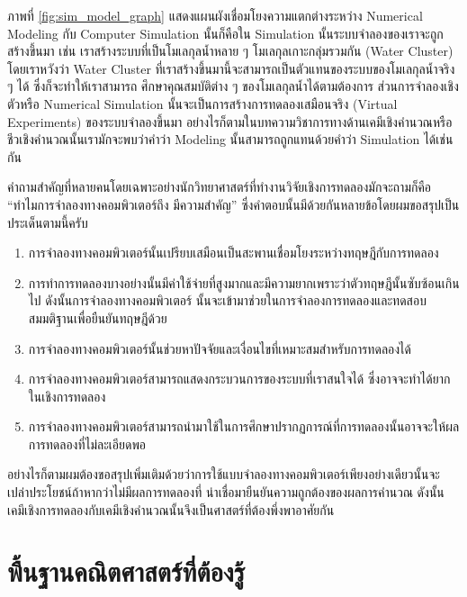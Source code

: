 ภาพที่ \ref{fig:sim_model_graph} แสดงแผนผังเชื่อมโยงความแตกต่างระหว่าง Numerical Modeling กับ Computer Simulation
นั้นก็คือใน Simulation นั้นระบบจำลองของเราจะถูกสร้างขึ้นมา เช่น เราสร้างระบบที่เป็นโมเลกุลน้ำหลาย ๆ โมเลกุลเกาะกลุ่มรวมกัน (Water
Cluster) โดยเราหวังว่า Water Cluster ที่เราสร้างขึ้นมานี้จะสามารถเป็นตัวแทนของระบบของโมเลกุลน้ำจริง ๆ ได้ ซึ่งก็จะทำให้เราสามารถ%
ศึกษาคุณสมบัติต่าง ๆ ของโมเลกุลน้ำได้ตามต้องการ ส่วนการจำลองเชิงตัวหรือ Numerical Simulation นั้นจะเป็นการสร้างการทดลองเสมือนจริง
(Virtual Experiments) ของระบบจำลองขึ้นมา อย่างไรก็ตามในบทความวิชาการทางด้านเคมีเชิงคำนวณหรือชีวเชิงคำนวณนั้นเรามักจะพบว่าคำว่า
Modeling นั้นสามารถถูกแทนด้วยคำว่า Simulation ได้เช่นกัน

คำถามสำคัญที่หลายคนโดยเฉพาะอย่างนักวิทยาศาสตร์ที่ทำงานวิจัยเชิงการทดลองมักจะถามก็คือ \enquote{ทำไมการจำลองทางคอมพิวเตอร์ถึง%
    มีความสำคัญ} ซึ่งคำตอบนั้นมีด้วยกันหลายข้อโดยผมขอสรุปเป็นประเด็นตามนี้ครับ

\begin{enumerate}[topsep=0pt,noitemsep]
    \setlength\itemsep{1em}
    \item การจำลองทางคอมพิวเตอร์นั้นเปรียบเสมือนเป็นสะพานเชื่อมโยงระหว่างทฤษฎีกับการทดลอง

    \item การทำการทดลองบางอย่างนั้นมีค่าใช้จ่ายที่สูงมากและมีความยากเพราะว่าตัวทฤษฎีนั้นซับซ้อนเกินไป ดังนั้นการจำลองทางคอมพิวเตอร์%
          นั้นจะเข้ามาช่วยในการจำลองการทดลองและทดสอบสมมติฐานเพื่อยืนยันทฤษฎีด้วย

    \item การจำลองทางคอมพิวเตอร์นั้นช่วยหาปัจจัยและเงื่อนไขที่เหมาะสมสำหรับการทดลองได้

    \item การจำลองทางคอมพิวเตอร์สามารถแสดงกระบวนการของระบบที่เราสนใจได้ ซึ่งอาจจะทำได้ยากในเชิงการทดลอง

    \item การจำลองทางคอมพิวเตอร์สามารถนำมาใช้ในการศึกษาปรากฏการณ์ที่การทดลองนั้นอาจจะให้ผลการทดลองที่ไม่ละเอียดพอ
\end{enumerate}

อย่างไรก็ตามผมต้องขอสรุปเพิ่มเติมด้วยว่าการใช้แบบจำลองทางคอมพิวเตอร์เพียงอย่างเดียวนั้นจะเปล่าประโยชน์ถ้าหากว่าไม่มีผลการทดลองที่%
น่าเชื่อมายืนยันความถูกต้องของผลการคำนวณ ดังนั้นเคมีเชิงการทดลองกับเคมีเชิงคำนวณนั้นจึงเป็นศาสตร์ที่ต้องพึ่งพาอาศัยกัน

\section{พื้นฐานคณิตศาสตร์ที่ต้องรู้}

